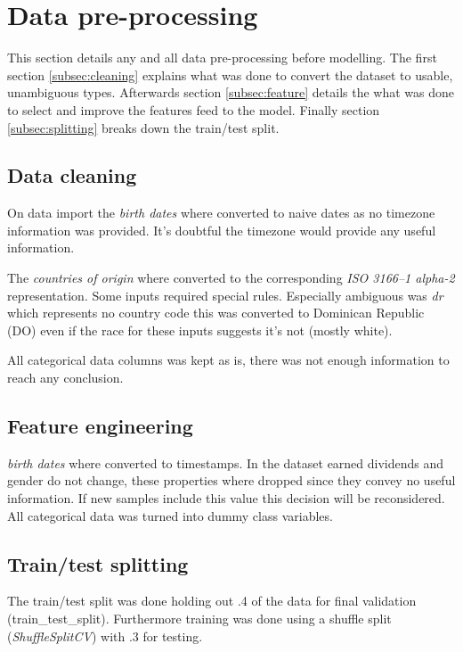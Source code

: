 \section{Data pre-processing}
\label{sec:data}

This section details any and all data pre-processing before modelling.
The first section \vref{subsec:cleaning} explains what was done to
convert the dataset to usable, unambiguous types.
Afterwards section \vref{subsec:feature} details the what was
done to select and improve the features feed to the model.
Finally section \vref{subsec:splitting} breaks down the train/test split.


\subsection{Data cleaning}
\label{subsec:cleaning}

On data import the \emph{birth dates} where converted to naive dates as no
timezone information was provided.
It's doubtful the timezone would provide any useful information.

The \emph{countries of origin} where converted
to the corresponding \emph{ISO 3166--1 alpha-2} representation.
Some inputs required special rules.
Especially ambiguous was \emph{dr} which
represents no country code this was converted to Dominican Republic (DO)
even if the race for these inputs suggests it's not (mostly white).

All categorical data columns was kept as is, there was not enough information
to reach any conclusion.


\subsection{Feature engineering}
\label{subsec:feature}

\emph{birth dates} where converted to timestamps.
In the dataset earned dividends and gender do not change,
these properties where dropped since they convey no useful information.
If new samples include this value this decision will be reconsidered.
All categorical data was turned into dummy class variables.

\subsection{Train/test splitting}
\label{subsec:splitting}

The train/test split was done holding out .4 of the data for final
validation (train{\_}test{\_}split).
Furthermore training was done using a shuffle split (\emph{ShuffleSplitCV})
with .3 for testing.

